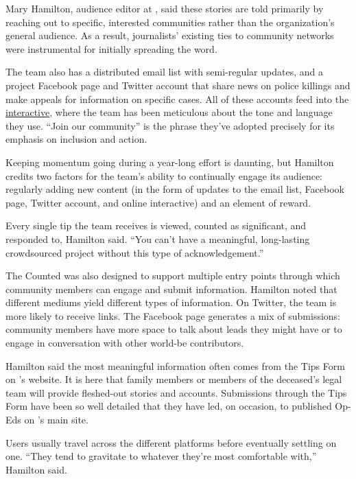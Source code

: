 \begin{itemize}
\begin{enumerate}
{Mary Hamilton, audience editor at , said these stories are told primarily by reaching out to specific, interested communities rather than the organization’s general audience.\autocite{Hamilton} As a result, journalists’ existing ties to community networks were instrumental for initially spreading the word.

The team also has a distributed email list with semi-regular updates, and a project Facebook page and Twitter account that share news on police killings and make appeals for information on specific cases. All of these accounts feed into the \href{http://www.theguardian.com/us-news/ng-interactive/2015/jun/01/the-counted-police-killings-us-database}{interactive},\autocite{MPExpense} where the team has been meticulous about the tone and language they use. ``Join our community'' is the phrase they’ve adopted precisely for its emphasis on inclusion and action. 

Keeping momentum going during a year-long effort is daunting, but Hamilton credits two factors for the team’s ability to continually engage its audience: regularly adding new content (in the form of updates to the email list, Facebook page, Twitter account, and online interactive) and an element of reward. 

Every single tip the team receives is viewed, counted as significant, and responded to, Hamilton said. ``You can’t have a meaningful, long-lasting crowdsourced project without this type of acknowledgement.''

The Counted was also designed to support multiple entry points through which community members can engage and submit information.
Hamilton noted that different mediums yield different types of information. On Twitter, the team is more likely to receive links. The Facebook page generates a mix of submissions: community members have more space to talk about leads they might have or to engage in conversation with other world-be contributors.

Hamilton said the most meaningful information often comes from the Tips Form on ’s website. It is here that family members or members of the deceased’s legal team will provide fleshed-out stories and accounts. Submissions through the Tips Form have been so well detailed that they have led, on occasion, to published Op-Eds on ’s main site.

Users usually travel across the different platforms before eventually settling on one. ``They tend to gravitate to whatever they’re most comfortable with,'' Hamilton said.

}
\end{enumerate}
\end{itemize}
